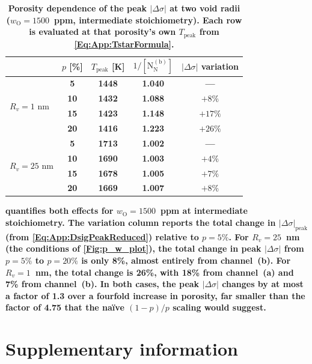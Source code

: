 \documentclass[preprint,12pt,sort&compress]{elsarticle}
\newcommand{\?}{\stackrel{?}{=}}
\providecommand{\DIFaddtex}[1]{{\bf #1}} %
\providecommand{\DIFaddend}{\protect\color{black}} %
\providecommand{\DIFaddFL}[1]{\DIFadd{#1}} %
\providecommand{\DIFadd}[1]{\texorpdfstring{\DIFaddtex{#1}}{#1}} %
\DeclareRobustCommand{\DIFaddend}{\DIFOaddend \let\includegraphics\DIFOincludegraphics} %
\begin{document}
\begin{table}[h!]
\centering
\footnotesize
\caption{\DIFaddFL{Porosity dependence of the peak $|\Delta \sigma|$ at two void radii ($w_\text{O} = 1500$~ppm, intermediate stoichiometry). Each row is evaluated at that porosity's own $T_\text{peak}$ from \cref{Eq:App:TstarFormula}.}}
\label{Tab:App:por}
\begin{tabular}{lcccc}
\hline
& \DIFaddFL{$p$ }[\DIFaddFL{\%}] & \DIFaddFL{$T_\text{peak}$ }[\DIFaddFL{K}] & \DIFaddFL{$1/[\text{N}_\text{N}^{(\text{b})}]$ }& \DIFaddFL{$|\Delta\sigma|$ variation }\\
\hline
\multirow{4}{*}{$R_v = 1$ nm}
& \DIFaddFL{5  }& \DIFaddFL{1448 }& \DIFaddFL{1.040 }& \DIFaddFL{--- }\\
& \DIFaddFL{10 }& \DIFaddFL{1432 }& \DIFaddFL{1.088 }& \DIFaddFL{$+8\%$ }\\
& \DIFaddFL{15 }& \DIFaddFL{1423 }& \DIFaddFL{1.148 }& \DIFaddFL{$+17\%$ }\\
& \DIFaddFL{20 }& \DIFaddFL{1416 }& \DIFaddFL{1.223 }& \DIFaddFL{$+26\%$ }\\
\hline
\multirow{4}{*}{$R_v = 25$ nm}
& \DIFaddFL{5  }& \DIFaddFL{1713 }& \DIFaddFL{1.002 }& \DIFaddFL{--- }\\
& \DIFaddFL{10 }& \DIFaddFL{1690 }& \DIFaddFL{1.003 }& \DIFaddFL{$+4\%$ }\\
& \DIFaddFL{15 }& \DIFaddFL{1678 }& \DIFaddFL{1.005 }& \DIFaddFL{$+7\%$ }\\
& \DIFaddFL{20 }& \DIFaddFL{1669 }& \DIFaddFL{1.007 }& \DIFaddFL{$+8\%$ }\\
\hline
\end{tabular}
\end{table}

\DIFadd{ quantifies both effects for $w_\text{O} = 1500$~ppm at intermediate stoichiometry. The variation column reports the total change in $|\Delta\sigma|_\text{peak}$ (from \cref{Eq:App:DsigPeakReduced}) relative to $p = 5\%$. For $R_v = 25$~nm (the conditions of \cref{Fig:p_w_plot}), the total change in peak $|\Delta\sigma|$ from $p = 5\%$ to $p = 20\%$ is only 8\%, almost entirely from channel~(b). For $R_v = 1$~nm, the total change is 26\%, with 18\% from channel~(a) and 7\% from channel~(b). In both cases, the peak $|\Delta\sigma|$ changes by at most a factor of 1.3 over a fourfold increase in porosity, far smaller than the factor of 4.75 that the na\"ive $(1-p)/p$ scaling would suggest.
}

\FloatBarrier

\DIFaddend \section{Supplementary information}
\label{App3}
\end{document}

